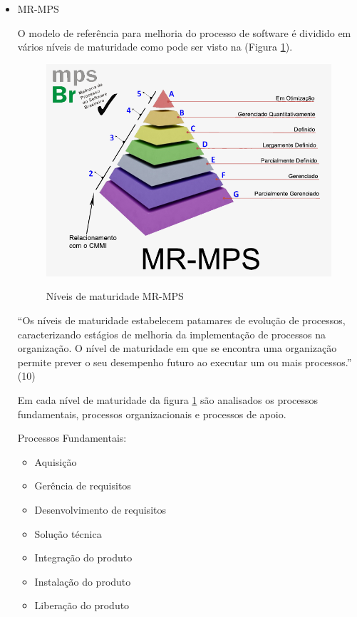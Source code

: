 \begin{itemize}

\item MR-MPS

O modelo de referência para melhoria do processo de software é dividido em vários níveis de maturidade como pode ser visto na (Figura \ref{img:MR-MPS2}).

\begin{figure}[H]
		\centering
		\caption{Níveis de maturidade MR-MPS}
		\includegraphics[width=\textwidth]{figuras/MR-MPS2}
		\label{img:MR-MPS2}
\end{figure}

“Os níveis de maturidade estabelecem patamares de evolução de processos, caracterizando estágios de melhoria da implementação de processos na organização. O nível de maturidade em que se encontra uma organização permite prever o seu desempenho futuro ao executar um ou mais processos.” (10)

Em cada nível de maturidade da figura \ref{img:MR-MPS2}  são analisados os processos fundamentais, processos organizacionais e processos de apoio.

Processos Fundamentais:

\begin{itemize}
\item Aquisição
\item Gerência de requisitos
\item Desenvolvimento de requisitos
\item Solução técnica
\item Integração do produto
\item Instalação do produto
\item Liberação do produto
\end{itemize}


\end{itemize}
